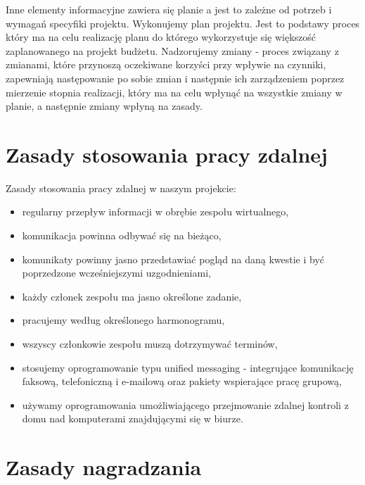 Inne elementy informacyjne zawiera się planie a jest to zależne od potrzeb i wymagań specyfiki projektu.
Wykonujemy plan projektu. Jest to podstawy proces który ma na celu realizację planu do którego wykorzystuje się większość zaplanowanego na projekt budżetu.
Nadzorujemy zmiany - proces związany z zmianami, które przynoszą oczekiwane korzyści przy wpływie na czynniki, zapewniają następowanie po sobie zmian i następnie ich zarządzeniem poprzez mierzenie stopnia realizacji, który ma na celu wpłynąć na wszystkie zmiany w planie, 
a następnie zmiany wpłyną na zasady.




\section{Zasady stosowania pracy zdalnej}

Zasady stosowania pracy zdalnej w naszym projekcie:
\begin{itemize}
\item regularny przepływ informacji w obrębie zespołu wirtualnego,
\item komunikacja powinna odbywać się na bieżąco,
\item komunikaty powinny jasno przedstawiać pogląd na daną kwestie i  być poprzedzone wcześniejszymi uzgodnieniami,
\item każdy członek zespołu ma jasno określone zadanie,
\item pracujemy według określonego harmonogramu,
\item wszyscy członkowie zespołu muszą dotrzymywać terminów,
\item stosujemy oprogramowanie typu unified messaging - integrujące komunikację faksową, telefoniczną i e-mailową oraz pakiety wspierające pracę grupową,
\item używamy oprogramowania umożliwiającego przejmowanie zdalnej kontroli z domu nad komputerami znajdującymi się w biurze.

\end{itemize}



\section{Zasady nagradzania}


